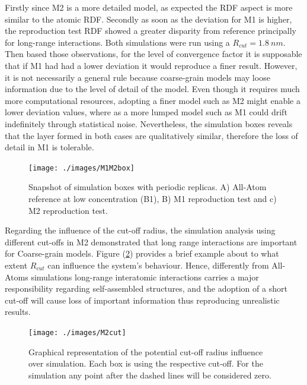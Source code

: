 \documentclass[10pt,a4paper,twoside]{article}
\begin{document}
Firstly since M2 is a more detailed  model, as expected the RDF aspect is more similar to the atomic RDF. Secondly as soon as the deviation for M1 is higher, the reproduction test RDF showed a greater disparity from reference principally for long-range interactions. Both simulations were run using a $R_{cut} = 1.8 \ nm$.  Then based those observations, for the level of convergence factor it is supposable that if M1 had had a lower deviation it would reproduce a finer result. However, it is not necessarily a general rule because coarse-grain models may loose information due to the level of detail of the model. Even though it requires much more computational resources, adopting a finer model such as M2 might enable a lower deviation values, where as a more lumped model such as M1 could drift indefinitely through statistical noise. Nevertheless, the simulation boxes reveals that the layer formed in both cases are qualitatively similar, therefore the loss of detail in M1 is tolerable.
   

     \begin{figure}[ht!]
  \begin{center}
	\texttt{[image: ./images/M1M2box]}
	\caption{Snapshot of simulation boxes with periodic replicas. A) All-Atom reference at low concentration (B1), B) M1 reproduction test and c) M2 reproduction test.}
	\label{Fig:M1M2box}
  \end{center}
\end{figure}

Regarding the influence of the cut-off radius, the simulation analysis using different cut-offs in M2 demonstrated that long range interactions are important for Coarse-grain models. Figure (\ref{Fig:M2cut}) provides a brief example about to what extent  $R_{cut}$ can influence the system's behaviour. Hence, differently from All-Atoms simulations long-range interatomic interactions carries a major responsibility regarding self-assembled structures, and the adoption of a short cut-off will cause loss of important information thus reproducing unrealistic results.

 \begin{figure}[H]
  \begin{center}
	\texttt{[image: ./images/M2cut]}
	\caption{Graphical representation of the potential cut-off radius influence over simulation. Each box is using the respective cut-off. For the simulation any point after the dashed lines will be considered zero. }
	\label{Fig:M2cut}
  \end{center}
\end{figure}
\end{document}
